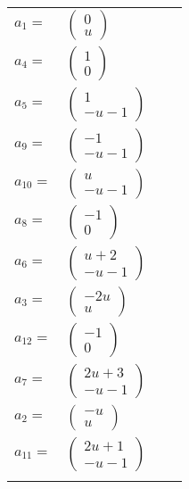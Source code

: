 \documentclass[1p]{elsarticle_modified}
\theoremstyle{definition}
\begin{document}
\begin{tabular}{m{7pt} m{180pt} m{7pt} m{180pt} }
\flushright $a_{1}=$&$\begin{pmatrix}0\\u\end{pmatrix}$ \\
\flushright $a_{4}=$&$\begin{pmatrix}1\\0\end{pmatrix}$ \\
\flushright $a_{5}=$&$\begin{pmatrix}1\\- u-1\end{pmatrix}$ \\
\flushright $a_{9}=$&$\begin{pmatrix}-1\\- u-1\end{pmatrix}$ \\
\flushright $a_{10}=$&$\begin{pmatrix}u\\- u-1\end{pmatrix}$ \\
\flushright $a_{8}=$&$\begin{pmatrix}-1\\0\end{pmatrix}$ \\
\flushright $a_{6}=$&$\begin{pmatrix}u+2\\- u-1\end{pmatrix}$ \\
\flushright $a_{3}=$&$\begin{pmatrix}-2 u\\u\end{pmatrix}$ \\
\flushright $a_{12}=$&$\begin{pmatrix}-1\\0\end{pmatrix}$ \\
\flushright $a_{7}=$&$\begin{pmatrix}2 u+3\\- u-1\end{pmatrix}$ \\
\flushright $a_{2}=$&$\begin{pmatrix}- u\\u\end{pmatrix}$ \\
\flushright $a_{11}=$&$\begin{pmatrix}2 u+1\\- u-1\end{pmatrix}$\\&\end{tabular}
\end{document}
